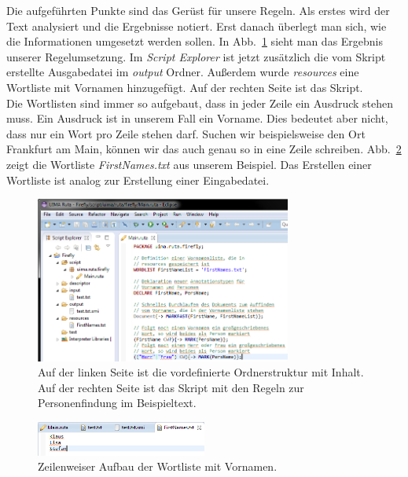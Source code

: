 \documentclass{article}
\begin{document}
Die aufgeführten Punkte sind das Gerüst für unsere Regeln. Als erstes wird der Text analysiert und die Ergebnisse notiert. Erst danach überlegt man sich, wie die Informationen umgesetzt werden sollen. In Abb.~\ref{rules} sieht man das Ergebnis unserer Regelumsetzung. Im \textit{Script Explorer} ist jetzt zusätzlich die vom Skript erstellte Ausgabedatei im \textit{output} Ordner. Außerdem wurde \textit{resources} eine Wortliste mit Vornamen hinzugefügt. Auf der rechten Seite ist das Skript.\\
Die Wortlisten sind immer so aufgebaut, dass in jeder Zeile ein Ausdruck stehen muss. Ein Ausdruck ist in unserem Fall ein Vorname. Dies bedeutet aber nicht, dass nur ein Wort pro Zeile stehen darf. Suchen wir beispielsweise den Ort \glqq Frankfurt am Main\grqq, können wir das auch genau so in eine Zeile schreiben. Abb.~\ref{wordlist} zeigt die Wortliste \textit{FirstNames.txt} aus unserem Beispiel. Das Erstellen einer Wortliste ist analog zur Erstellung einer Eingabedatei.

\begin{figure}
\centering
\includegraphics[width=0.75\textwidth]{figs/capture_rules.png}
\caption{Auf der linken Seite ist die vordefinierte Ordnerstruktur mit Inhalt. Auf der rechten Seite ist das Skript mit den Regeln zur Personenfindung im Beispieltext.}
\label{rules}
\end{figure}

\begin{figure}
\centering
\includegraphics[width=0.5\textwidth]{figs/capture_wordlist.png}
\caption{Zeilenweiser Aufbau der Wortliste mit Vornamen.}
\label{wordlist}
\end{figure}
\end{document}
